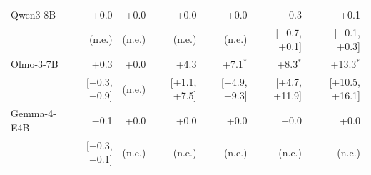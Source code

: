 \begin{tabular}{lrrrrrr}
Qwen3-8B & +0.0 & +0.0 & +0.0 & +0.0 & $-$0.3 & +0.1 \\
 & (n.e.) & (n.e.) & (n.e.) & (n.e.) & [$-$0.7, +0.1] & [$-$0.1, +0.3] \\[2pt]
Olmo-3-7B & +0.3 & +0.0 & +4.3 & +7.1$^{*}$ & +8.3$^{*}$ & +13.3$^{*}$ \\
 & [$-$0.3, +0.9] & (n.e.) & [+1.1, +7.5] & [+4.9, +9.3] & [+4.7, +11.9] & [+10.5, +16.1] \\[2pt]
Gemma-4-E4B & $-$0.1 & +0.0 & +0.0 & +0.0 & +0.0 & +0.0 \\
 & [$-$0.3, +0.1] & (n.e.) & (n.e.) & (n.e.) & (n.e.) & (n.e.) \\
\bottomrule
\end{tabular}

